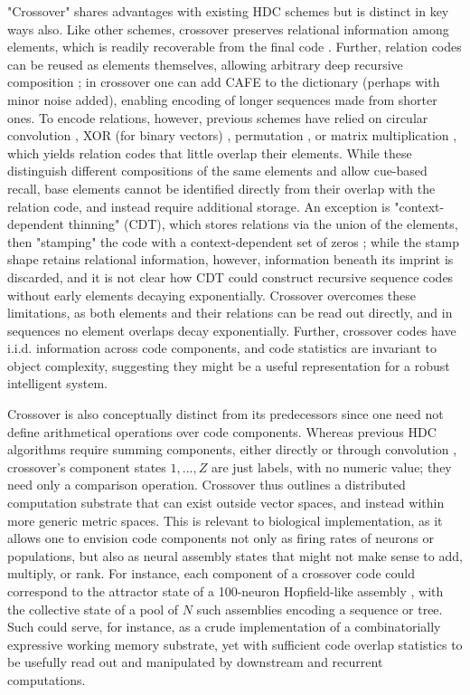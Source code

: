 \documentclass{article}
\begin{document}
"Crossover" shares advantages with existing HDC schemes but is distinct in key ways also. Like other schemes, crossover preserves relational information among elements, which is readily recoverable from the final code \cite{Kanerva:2009}. Further, relation codes can be reused as elements themselves, allowing arbitrary deep recursive composition \cite{Kanerva:2009}; in crossover one can add CAFE to the dictionary (perhaps with minor noise added), enabling encoding of longer sequences made from shorter ones. To encode relations, however, previous schemes have relied on circular convolution \cite{Plate:1995}, XOR (for binary vectors) \cite{Kanerva:1996}, permutation \cite{Sahlgren:2008, Gayler:1998}, or matrix multiplication \cite{Gosmann:2019}, which yields relation codes that little overlap their elements. While these distinguish different compositions of the same elements and allow cue-based recall, base elements cannot be identified directly from their overlap with the relation code, and instead require additional storage. An exception is "context-dependent thinning" (CDT), which stores relations via the union of the elements, then "stamping" the code with a context-dependent set of zeros \cite{Rachkovskij:2001}; while the stamp shape retains relational information, however, information beneath its imprint is discarded, and it is not clear how CDT could construct recursive sequence codes without early elements decaying exponentially. Crossover overcomes these limitations, as both elements and their relations can be read out directly, and in sequences no element overlaps decay exponentially. Further, crossover codes have i.i.d. information across code components, and code statistics are invariant to object complexity, suggesting they might be a useful representation for a robust intelligent system.

Crossover is also conceptually distinct from its predecessors since one need not define arithmetical operations over code components. Whereas previous HDC algorithms require summing components, either directly or through convolution \cite{Plate:1995, Kanerva:1996, Gayler:1998, Rachkovskij:2001, Sahlgren:2008, Gosmann:2019}, crossover's component states $1, ..., Z$ are just labels, with no numeric value; they need only a comparison operation. Crossover thus outlines a distributed computation substrate that can exist outside vector spaces, and instead within more generic metric spaces. This is relevant to biological implementation, as it allows one to envision code components not only as firing rates of neurons or populations, but also as neural assembly states that might not make sense to add, multiply, or rank. For instance, each component of a crossover code could correspond to the attractor state of a 100-neuron Hopfield-like assembly \cite{Hopfield:1982}, with the collective state of a pool of $N$ such assemblies encoding a sequence or tree. Such could serve, for instance, as a crude implementation of a combinatorially expressive working memory substrate, yet with sufficient code overlap statistics to be usefully read out and manipulated by downstream and recurrent computations.
\end{document}
